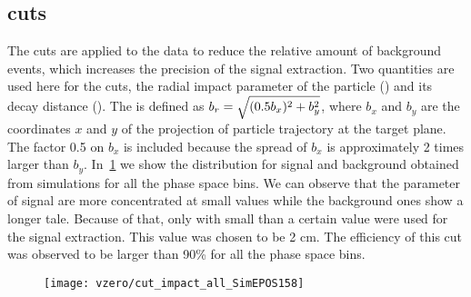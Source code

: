\subsection{\vzero cuts}
\label{sec:hadron:vzero:signal:cuts}


The \vzero cuts are applied to the \minv data to reduce
the relative amount of background events, which
increases the precision of the signal extraction. 
Two quantities are used here for the \vzero cuts,
the radial impact parameter of the \vzero particle (\impact)
and its decay distance (\decaydist). The \impact is defined
as $\mbox{$b_r$} = \sqrt{(0.5b_x)^2+b_y^2}$, where $b_x$ and
$b_y$ are the coordinates $x$ and $y$ of the projection of \vzero particle
trajectory at the target plane. The factor 0.5 on $b_x$ is included
because the spread of $b_x$ is approximately 2 times larger than $b_y$.
In~\cref{fig:hadron:vzero:cuts:impact}
we show the \impact distribution for signal and background
obtained from simulations for all the phase space bins.
We can observe that the \impact parameter of signal \vzeros
are more concentrated at small values while the background ones
show a longer tale. Because of that, only \vzeros with \impact
small than a certain value were used for the signal extraction.
This value was chosen to be 2 cm. The efficiency of this cut
was observed to be larger than 90\% for all the phase space bins.

\begin{figure}
  \centering
  \texttt{[image: vzero/cut\_impact\_all\_SimEPOS158]}
  
  \caption{}
  \label{fig:hadron:vzero:cuts:impact}
\end{figure}

